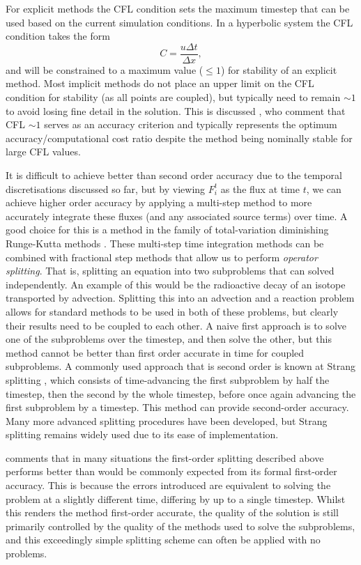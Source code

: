 For explicit methods the CFL condition sets the maximum timestep that can be used based on the current simulation conditions.
In a hyperbolic system the CFL condition takes the form
\begin{equation}
    C = \frac{u\Delta t}{\Delta x},
\end{equation}
and will be constrained to a maximum value ($\leq 1$) for stability of an explicit method.
Most implicit methods do not place an upper limit on the CFL condition for stability (as all points are coupled), but typically need to remain $\sim 1$ to avoid losing fine detail in the solution.
This is discussed \citet{Viallet2011}, who comment that CFL $\sim 1$ serves as an accuracy criterion and typically represents the optimum accuracy/computational cost ratio despite the method being nominally stable for large CFL values.

It is difficult to achieve better than second order accuracy due to the temporal discretisations discussed so far, but by viewing $F_i^t$ as the flux at time $t$, we can achieve higher order accuracy by applying a multi-step method to more accurately integrate these fluxes (and any associated source terms) over time.
A good choice for this is a method in the family of total-variation diminishing Runge-Kutta methods \citep[e.g.][]{Shu1988}.
These multi-step time integration methods can be combined with fractional step methods that allow us to perform \emph{operator splitting}.
That is, splitting an equation into two subproblems that can solved independently.
An example of this would be the radioactive decay of an isotope transported by advection.
Splitting this into an advection and a reaction problem allows for standard methods to be used in both of these problems, but clearly their results need to be coupled to each other.
A naive first approach is to solve one of the subproblems over the timestep, and then solve the other, but this method cannot be better than first order accurate in time for coupled subproblems.
A commonly used approach that is second order is known at Strang splitting \citep{Strang1968}, which consists of time-advancing the first subproblem by half the timestep, then the second by the whole timestep, before once again advancing the first subproblem by a timestep.
This method can provide second-order accuracy.
Many more advanced splitting procedures have been developed, but Strang splitting remains widely used due to its ease of implementation.

\citet{LeVeque1997} comments that in many situations the first-order splitting described above performs better than would be commonly expected from its formal first-order accuracy.
This is because the errors introduced are equivalent to solving the problem at a slightly different time, differing by up to a single timestep.
Whilst this renders the method first-order accurate, the quality of the solution is still primarily controlled by the quality of the methods used to solve the subproblems, and this exceedingly simple splitting scheme can often be applied with no problems.

